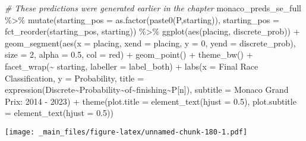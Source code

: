 \documentclass[
]{book}
\newenvironment{Shaded}{\begin{snugshade}}{\end{snugshade}}
\newcommand{\AttributeTok}[1]{\textcolor[rgb]{0.77,0.63,0.00}{#1}}
\newcommand{\CommentTok}[1]{\textcolor[rgb]{0.56,0.35,0.01}{\textit{#1}}}
\newcommand{\DecValTok}[1]{\textcolor[rgb]{0.00,0.00,0.81}{#1}}
\newcommand{\FloatTok}[1]{\textcolor[rgb]{0.00,0.00,0.81}{#1}}
\newcommand{\FunctionTok}[1]{\textcolor[rgb]{0.00,0.00,0.00}{#1}}
\newcommand{\NormalTok}[1]{#1}
\newcommand{\SpecialCharTok}[1]{\textcolor[rgb]{0.00,0.00,0.00}{#1}}
\newcommand{\StringTok}[1]{\textcolor[rgb]{0.31,0.60,0.02}{#1}}
\begin{document}
\begin{Shaded}
\begin{Highlighting}[]
\CommentTok{\# These predictions were generated earlier in the chapter}
\NormalTok{monaco\_preds\_se\_full }\SpecialCharTok{\%\textgreater{}\%}
  \FunctionTok{mutate}\NormalTok{(}\AttributeTok{starting\_pos =} \FunctionTok{as.factor}\NormalTok{(}\FunctionTok{paste0}\NormalTok{(}\StringTok{\textquotesingle{}P\textquotesingle{}}\NormalTok{,starting)),}
         \AttributeTok{starting\_pos =} \FunctionTok{fct\_reorder}\NormalTok{(starting\_pos, starting)) }\SpecialCharTok{\%\textgreater{}\%}
  \FunctionTok{ggplot}\NormalTok{(}\FunctionTok{aes}\NormalTok{(placing, discrete\_prob)) }\SpecialCharTok{+}
  \FunctionTok{geom\_segment}\NormalTok{(}\FunctionTok{aes}\NormalTok{(}\AttributeTok{x =}\NormalTok{ placing, }\AttributeTok{xend =}\NormalTok{ placing, }\AttributeTok{y =} \DecValTok{0}\NormalTok{, }\AttributeTok{yend =}\NormalTok{ discrete\_prob),}
               \AttributeTok{size =} \DecValTok{2}\NormalTok{, }\AttributeTok{alpha =} \FloatTok{0.5}\NormalTok{, }\AttributeTok{col =} \StringTok{\textquotesingle{}red\textquotesingle{}}\NormalTok{) }\SpecialCharTok{+}
  \FunctionTok{geom\_point}\NormalTok{() }\SpecialCharTok{+}
  \FunctionTok{theme\_bw}\NormalTok{() }\SpecialCharTok{+}
  \FunctionTok{facet\_wrap}\NormalTok{(}\SpecialCharTok{\textasciitilde{}}\NormalTok{ starting, }\AttributeTok{labeller =}\NormalTok{ label\_both) }\SpecialCharTok{+}
  \FunctionTok{labs}\NormalTok{(}\AttributeTok{x =} \StringTok{\textquotesingle{}Final Race Classification\textquotesingle{}}\NormalTok{,}
       \AttributeTok{y =} \StringTok{\textquotesingle{}Probability\textquotesingle{}}\NormalTok{,}
       \AttributeTok{title =} \FunctionTok{expression}\NormalTok{(Discrete}\SpecialCharTok{\textasciitilde{}}\NormalTok{Probability}\SpecialCharTok{\textasciitilde{}}\NormalTok{of}\SpecialCharTok{\textasciitilde{}}\NormalTok{finishing}\SpecialCharTok{\textasciitilde{}}\NormalTok{P[n]),}
       \AttributeTok{subtitle =} \StringTok{\textquotesingle{}Monaco Grand Prix: 2014 {-} 2023\textquotesingle{}}\NormalTok{) }\SpecialCharTok{+}
  \FunctionTok{theme}\NormalTok{(}\AttributeTok{plot.title =} \FunctionTok{element\_text}\NormalTok{(}\AttributeTok{hjust =} \FloatTok{0.5}\NormalTok{),}
        \AttributeTok{plot.subtitle =} \FunctionTok{element\_text}\NormalTok{(}\AttributeTok{hjust =} \FloatTok{0.5}\NormalTok{)) }
\end{Highlighting}
\end{Shaded}

\texttt{[image: \_main\_files/figure-latex/unnamed-chunk-180-1.pdf]}
\end{document}
